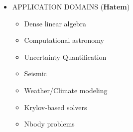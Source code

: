 \begin{itemize}
	\item APPLICATION DOMAINS  (\textbf{Hatem})
		\begin{itemize}
			\item Dense linear algebra
			\item Computational astronomy
			\item Uncertainty Quantification
			\item Seismic
			\item Weather/Climate modeling
			\item Krylov-based solvers
			\item Nbody problems
		\end{itemize}

\end{itemize}


